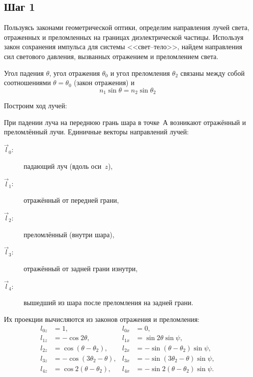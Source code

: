 \documentclass[a4paper]{article}
\begin{document}
\subsection{Шаг 1}

Пользуясь законами геометрической оптики, определим направления лучей света, отраженных и преломленных на границах диэлектрической частицы. 
Используя закон сохранения импульса для системы <<свет--тело>>, найдем направления сил светового давления, вызванных отражением и преломлением света.

Угол падения $\theta$, угол отражения $\theta_0$ и угол преломления $\theta_2$ связаны между собой соотношениями $\theta = \theta_0$ (закон отражения) и
\begin{equation}
    n_1 \sin \theta = n_2 \sin \theta_2 \tag{1}
\end{equation}

Построим ход лучей:


При падении луча на переднюю грань шара в точке~А возникают отражённый и преломлённый лучи. Единичные векторы направлений лучей:

\begin{description}
    \item[$\vec{l}_0$:] падающий луч (вдоль оси~$z$),
    \item[$\vec{l}_1$:] отражённый от передней грани,
    \item[$\vec{l}_2$:] преломлённый (внутри шара),
    \item[$\vec{l}_3$:] отражённый от задней грани изнутри,
    \item[$\vec{l}_4$:] вышедший из шара после преломления на задней грани.
\end{description}

Их проекции вычисляются из законов отражения и преломления:
\begin{equation}
\begin{aligned}
    l_{0z} &= 1, & l_{0x} &= 0, \\
    l_{1z} &= -\cos 2\theta, & l_{1x} &= \sin 2\theta \sin \psi, \\
    l_{2z} &= \cos(\theta - \theta_2), & l_{2x} &= -\sin(\theta - \theta_2) \sin \psi, \\
    l_{3z} &= -\cos(3\theta_2 - \theta), & l_{3x} &= -\sin(3\theta_2 - \theta) \sin \psi, \\
    l_{4z} &= \cos 2(\theta - \theta_2), & l_{4x} &= -\sin 2(\theta - \theta_2) \sin \psi.
\end{aligned}
\tag{2}
\end{equation}
\end{document}

